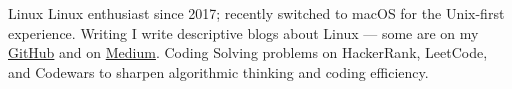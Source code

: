 


\begingroup\small\sloppy
\begin{cvskills}
  \cvskill
    {Linux} %
    {Linux enthusiast since 2017; recently switched to macOS for the Unix-first experience.} %
  \cvskill
    {Writing} %
    {I write descriptive blogs about Linux — some are on my \href{https://github.com/Ibrahimtareq952001}{GitHub} and on \href{https://medium.com/@ibrahimtarek_20588}{Medium}.} %
  \cvskill
    {Coding} %
    {Solving problems on HackerRank, LeetCode, and Codewars to sharpen algorithmic thinking and coding efficiency.} %


\end{cvskills}
\endgroup